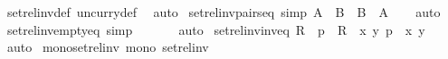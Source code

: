 \begin{isabellebody}
\ set{\isacharunderscore}{\kern0pt}rel{\isacharunderscore}{\kern0pt}inv{\isacharunderscore}{\kern0pt}def\ uncurry{\isacharunderscore}{\kern0pt}def\ \isamarkupfalse%
\ {\isacharparenleft}{\kern0pt}auto{\isacharparenright}{\kern0pt}%
\endisatagproof
{\isafoldproof}%
%
\isadelimproof
\isanewline
%
\endisadelimproof
\isanewline
{}\isamarkupfalse%
\ set{\isacharunderscore}{\kern0pt}rel{\isacharunderscore}{\kern0pt}inv{\isacharunderscore}{\kern0pt}pairs{\isacharunderscore}{\kern0pt}eq\ {\isacharbrackleft}{\kern0pt}simp{\isacharbrackright}{\kern0pt}{\isacharcolon}{\kern0pt}\ {\isachardoublequoteopen}{\isacharparenleft}{\kern0pt}A\ {\isasymtimes}\ B{\isacharparenright}{\kern0pt}{\isasyminverse}\ {\isacharequal}{\kern0pt}\ B\ {\isasymtimes}\ A{\isachardoublequoteclose}\isanewline
%
\isadelimproof
\ \ %
\endisadelimproof
%
\isatagproof
{}\isamarkupfalse%
\ auto%
\endisatagproof
{\isafoldproof}%
%
\isadelimproof
\isanewline
%
\endisadelimproof
\isanewline
{}\isamarkupfalse%
\ set{\isacharunderscore}{\kern0pt}rel{\isacharunderscore}{\kern0pt}inv{\isacharunderscore}{\kern0pt}empty{\isacharunderscore}{\kern0pt}eq\ {\isacharbrackleft}{\kern0pt}simp{\isacharbrackright}{\kern0pt}{\isacharcolon}{\kern0pt}\ {\isachardoublequoteopen}{\isacharbraceleft}{\kern0pt}{\isacharbraceright}{\kern0pt}{\isasyminverse}\ {\isacharequal}{\kern0pt}\ {\isacharbraceleft}{\kern0pt}{\isacharbraceright}{\kern0pt}{\isachardoublequoteclose}\isanewline
%
\isadelimproof
\ \ %
\endisadelimproof
%
\isatagproof
{}\isamarkupfalse%
\ auto%
\endisatagproof
{\isafoldproof}%
%
\isadelimproof
\isanewline
%
\endisadelimproof
\isanewline
{}\isamarkupfalse%
\ set{\isacharunderscore}{\kern0pt}rel{\isacharunderscore}{\kern0pt}inv{\isacharunderscore}{\kern0pt}inv{\isacharunderscore}{\kern0pt}eq{\isacharcolon}{\kern0pt}\ {\isachardoublequoteopen}R{\isasyminverse}{\isasyminverse}\ {\isacharequal}{\kern0pt}\ {\isacharbraceleft}{\kern0pt}p\ {\isasymin}\ R\ {\isacharbar}{\kern0pt}\ {\isasymexists}x\ y{\isachardot}{\kern0pt}\ p\ {\isacharequal}{\kern0pt}\ {\isasymlangle}x{\isacharcomma}{\kern0pt}\ y{\isasymrangle}{\isacharbraceright}{\kern0pt}{\isachardoublequoteclose}\isanewline
%
\isadelimproof
\ \ %
\endisadelimproof
%
\isatagproof
{}\isamarkupfalse%
\ auto%
\endisatagproof
{\isafoldproof}%
%
\isadelimproof
\isanewline
%
\endisadelimproof
\isanewline
{}\isamarkupfalse%
\ mono{\isacharunderscore}{\kern0pt}set{\isacharunderscore}{\kern0pt}rel{\isacharunderscore}{\kern0pt}inv{\isacharcolon}{\kern0pt}\ {\isachardoublequoteopen}mono\ set{\isacharunderscore}{\kern0pt}rel{\isacharunderscore}{\kern0pt}inv{\isachardoublequoteclose}\isanewline

\end{isabellebody}
